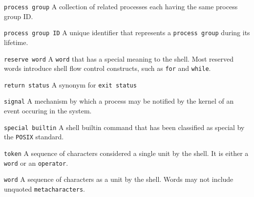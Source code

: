 \filbreak
\vskip 3mm
{\tt process group}
\vskip 1mm
A collection of related processes each having the same process group ID.

\filbreak
\vskip 3mm
{\tt process group ID}
\vskip 1mm
A unique identifier that represents a {\tt process group} during its lifetime.

\filbreak
\vskip 3mm
{\tt reserve word}
\vskip 1mm
A {\tt word} that has a special meaning to the shell. Most reserved words introduce shell flow control constructs, such as {\tt for} and {\tt while}.

\filbreak
\vskip 3mm
{\tt return status}
\vskip 1mm
A synonym for {\tt exit status}

\filbreak
\vskip 3mm
{\tt signal}
\vskip 1mm
A mechanism by which a process may be notified by the kernel of an event occuring in the system.

\filbreak
\vskip 3mm
{\tt special builtin}
\vskip 1mm
A shell builtin command that has been classified as special by the {\tt POSIX} standard.

\filbreak
\vskip 3mm
{\tt token}
\vskip 1mm
A sequence of characters considered a single unit by the shell. It is either a {\tt word} or an {\tt operator}.

\filbreak
\vskip 3mm
{\tt word}
\vskip 1mm
A sequence of characters as a unit by the shell. Words may not include unquoted {\tt metacharacters}.

\vfill\eject
\bye
